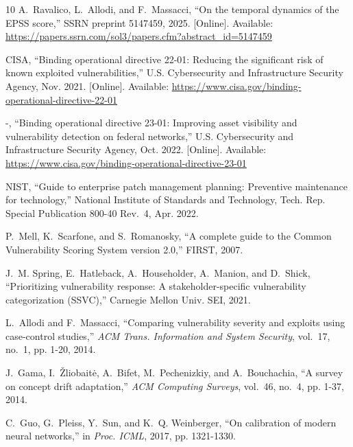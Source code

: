 \documentclass[journal]{IEEEtran}
\begin{document}
\begin{thebibliography}{10}
\BIBentryALTinterwordspacing
A.~Ravalico, L.~Allodi, and F.~Massacci, ``On the temporal dynamics of the
  {EPSS} score,'' SSRN preprint 5147459, 2025. [Online]. Available:
  \url{https://papers.ssrn.com/sol3/papers.cfm?abstract_id=5147459}
\BIBentrySTDinterwordspacing

\BIBentryALTinterwordspacing
{CISA}, ``Binding operational directive 22-01: Reducing the significant risk of
  known exploited vulnerabilities,'' U.S. Cybersecurity and Infrastructure
  Security Agency, Nov. 2021. [Online]. Available:
  \url{https://www.cisa.gov/binding-operational-directive-22-01}
\BIBentrySTDinterwordspacing

\BIBentryALTinterwordspacing
-, ``Binding operational directive 23-01: Improving asset visibility and
  vulnerability detection on federal networks,'' U.S. Cybersecurity and
  Infrastructure Security Agency, Oct. 2022. [Online]. Available:
  \url{https://www.cisa.gov/binding-operational-directive-23-01}
\BIBentrySTDinterwordspacing

{NIST}, ``Guide to enterprise patch management planning: Preventive maintenance
  for technology,'' National Institute of Standards and Technology, Tech. Rep.
  Special Publication 800-40 Rev.~4, Apr. 2022.

P.~Mell, K.~Scarfone, and S.~Romanosky, ``A complete guide to the Common
  Vulnerability Scoring System version 2.0,'' FIRST, 2007.

J.~M. Spring, E.~Hatleback, A.~Householder, A.~Manion, and D.~Shick,
  ``Prioritizing vulnerability response: A stakeholder-specific vulnerability
  categorization (SSVC),'' Carnegie Mellon Univ. SEI, 2021.

L.~Allodi and F.~Massacci, ``Comparing vulnerability severity and exploits
  using case-control studies,'' \emph{ACM Trans. Information and System
  Security}, vol.~17, no.~1, pp. 1-20, 2014.

J.~Gama, I.~\v{Z}liobait\.{e}, A.~Bifet, M.~Pechenizkiy, and A.~Bouchachia,
  ``A survey on concept drift adaptation,'' \emph{ACM Computing Surveys},
  vol.~46, no.~4, pp. 1-37, 2014.

C.~Guo, G.~Pleiss, Y.~Sun, and K.~Q. Weinberger, ``On calibration of modern
  neural networks,'' in \emph{Proc. ICML}, 2017, pp. 1321-1330.


\end{thebibliography}
\end{document}
